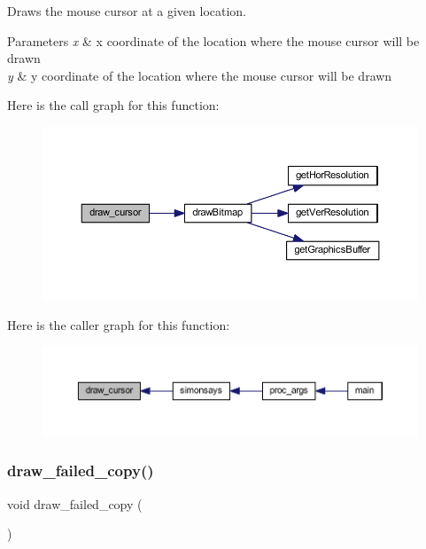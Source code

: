 Draws the mouse cursor at a given location. 


\begin{DoxyParams}{Parameters}
{\em x} & x coordinate of the location where the mouse cursor will be drawn \\
\hline
{\em y} & y coordinate of the location where the mouse cursor will be drawn \\
\hline
\end{DoxyParams}
Here is the call graph for this function\+:\nopagebreak
\begin{figure}[H]
\begin{center}
\leavevmode
\includegraphics[width=350pt]{group___bitmap_ga108608b0f2d804c84a271547036b6ffd_cgraph}
\end{center}
\end{figure}
Here is the caller graph for this function\+:\nopagebreak
\begin{figure}[H]
\begin{center}
\leavevmode
\includegraphics[width=350pt]{group___bitmap_ga108608b0f2d804c84a271547036b6ffd_icgraph}
\end{center}
\end{figure}
\mbox{\label{group___bitmap_ga06ba1c351da1ccdfa323137861c1a9af}} 
\subsubsection{\texorpdfstring{draw\+\_\+failed\+\_\+copy()}{draw\_failed\_copy()}}
{\footnotesize\ttfamily void draw\+\_\+failed\+\_\+copy (\begin{DoxyParamCaption}{ }\end{DoxyParamCaption})}



